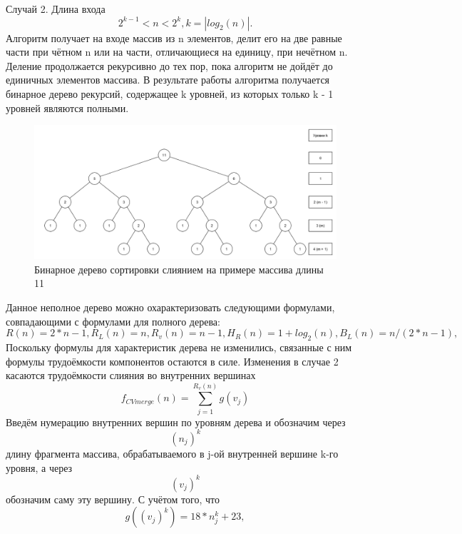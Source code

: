 \documentclass[12pt,a4paper]{scrartcl}
\begin{document}
Случай 2. Длина входа 
\begin{equation*}
2^{k-1} < n < 2^k, k = |log_2(n)|.
\end{equation*}
Алгоритм получает на входе массив из n элементов, делит его на две равные части при чётном n или на части, отличающиеся на единицу, при нечётном n. Деление продолжается рекурсивно до тех пор, пока алгоритм не дойдёт до единичных элементов массива. В результате работы алгоритма получается бинарное дерево рекурсий, содержащее k уровней, из которых только k - 1 уровней являются полными.
\begin{figure}[h!]
	\centering
	\includegraphics[width=\linewidth]{2.png}
	\caption{Бинарное дерево сортировки слиянием на примере массива длины 11}
	\label{graph2.12}
\end{figure}
Данное неполное дерево можно охарактеризовать следующими формулами, совпадающими с формулами для полного дерева:
\begin{equation}\label{eq2.23}
R(n) = 2*n - 1, R_L(n) = n, R_v(n) = n - 1, H_R(n) = 1 + log_2(n), B_L(n) = n / (2*n - 1),
\end{equation}
Поскольку формулы для характеристик дерева не изменились, связанные с ним формулы трудоёмкости компонентов остаются в силе. Изменения в случае 2 касаются трудоёмкости слияния во внутренних вершинах
\begin{equation}\label{eq2.24}
f_{CV merge}(n) = \sum \limits_{j=1}^{R_v(n)} g(v_j)
\end{equation}
Введём нумерацию внутренних вершин по уровням дерева и обозначим через
\begin{equation*}
(n_j)^k
\end{equation*}
длину фрагмента массива, обрабатываемого в j-ой внутренней вершине k-го уровня, а через
\begin{equation*}
(v_j)^k
\end{equation*}
обозначим саму эту вершину. С учётом того, что
\begin{equation}\label{eq2.25}
g((v_j)^k) = 18*n_j^k + 23,
\end{equation}
\end{document}
